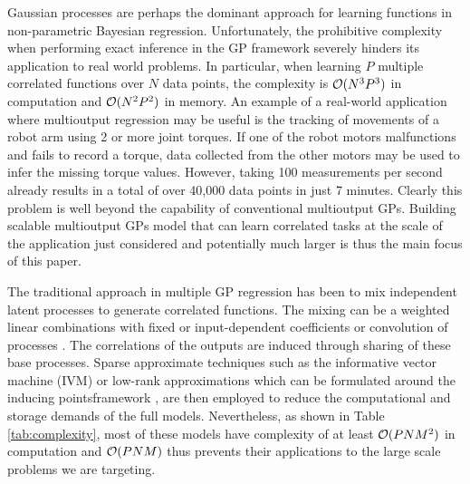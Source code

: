 Gaussian processes \citep[GPs,][]{rasmussen-williams-book} are perhaps the dominant approach for learning functions in non-parametric Bayesian regression.
Unfortunately, the prohibitive complexity when performing exact inference in the GP framework severely hinders its application to real world problems. 
In particular, when learning $P$ multiple correlated functions over $N$ data points, the complexity is $\mathcal{O}(N^3P^3)$ in computation and $\mathcal{O}(N^2P^2)$ in memory.
An example of a real-world application where multioutput regression may be useful is the tracking of  movements of a robot arm using 2 or more joint torques. 
If one of the robot motors malfunctions and fails to record a torque, data collected from the other motors may be used to infer the missing torque values.
However, taking 100 measurements per second already results in a total of over 40,000 data points in just 7 minutes.
Clearly this problem is well beyond the capability of conventional multioutput GPs.
Building scalable multioutput GPs model that can learn correlated tasks at the scale of the application just considered and potentially much larger is thus the main focus of this paper.

The traditional approach in multiple GP regression has been to mix independent latent processes to generate correlated functions.
The mixing can be a weighted linear combinations with fixed \citep{teh-et-al-aistats-05,bonilla-et-al-nips-08} or input-dependent \citep{wilson-et-al-icml-12,nguyen2013efficient} coefficients or convolution of processes \citep{boyle-frean-nips-05,alvarez-lawrence-nips-08}.
The correlations of the outputs are induced through sharing of these base processes.
Sparse approximate techniques such as the informative vector machine (IVM) \cite{lawrence2002fast} or low-rank approximations which can be formulated around the inducing pointsframework \citep{quinonero2005unifying},
are then employed to reduce the computational and storage demands of the full models.
Nevertheless, as shown in Table \ref{tab:complexity}, most of these models have complexity of at least $\mathcal{O}(PNM^2)$ in computation and $\mathcal{O}(PNM)$ thus prevents their applications to the  large scale problems we are targeting.

